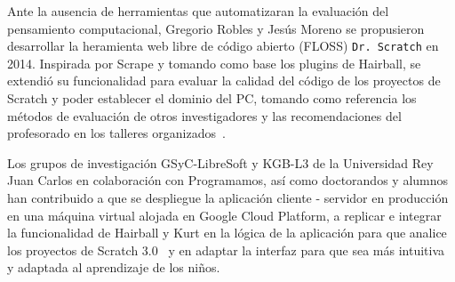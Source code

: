 \documentclass[a4paper, 12pt]{book}
\begin{document}
Ante la ausencia de herramientas que automatizaran la evaluación del pensamiento computacional, Gregorio Robles y Jesús Moreno se propusieron desarrollar la heramienta web libre de código abierto (FLOSS) \texttt{Dr. Scratch} en 2014. Inspirada por Scrape y tomando como base los plugins de Hairball, se extendió su funcionalidad para evaluar la calidad del código de los proyectos de Scratch y poder establecer el dominio del PC, tomando como referencia los métodos de evaluación de otros investigadores y las recomendaciones del profesorado en los talleres organizados~\cite{moreno2015dr}. %

Los grupos de investigación GSyC-LibreSoft y KGB-L3 de la Universidad Rey Juan Carlos en colaboración con Programamos, así como doctorandos y alumnos han contribuido a que se despliegue la aplicación cliente - servidor en producción en una  máquina virtual alojada en Google Cloud Platform, a replicar e integrar la funcionalidad de Hairball y Kurt en la lógica de la aplicación para que analice los proyectos de Scratch 3.0~\cite{vargas2020analysis} y en adaptar la interfaz para que sea más intuitiva y adaptada al aprendizaje de los niños. 
\end{document}

